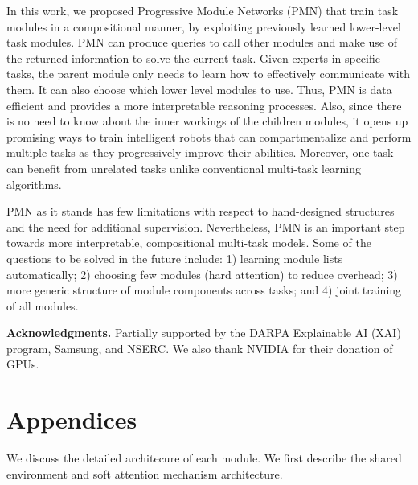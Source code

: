 \documentclass{article}
\begin{document}
In this work, we proposed Progressive Module Networks (PMN) that train task modules in a compositional manner, by exploiting previously learned lower-level task modules.
PMN can produce queries to call other modules and make use of the returned information to solve the current task.
Given experts in specific tasks, the parent module only needs to learn how to effectively communicate with them.
It can also choose which lower level modules to use.
Thus, PMN is data efficient and provides a more interpretable reasoning processes.
Also, since there is no need to know about the inner workings of the children modules,
it opens up promising ways to train intelligent robots that can compartmentalize and perform multiple tasks as they progressively improve their abilities.
Moreover, one task can benefit from unrelated tasks unlike conventional multi-task learning algorithms.

PMN as it stands has few limitations with respect to hand-designed structures and the need for additional supervision.
Nevertheless, PMN is an important step towards more interpretable, compositional multi-task models.
Some of the questions to be solved in the future include:
1) learning module lists automatically;
2) choosing few modules (hard attention) to reduce overhead;
3) more generic structure of module components across tasks; and
4) joint training of all modules.


\textbf{Acknowledgments.}
Partially supported by the DARPA Explainable AI (XAI) program, Samsung, and NSERC.
We also thank NVIDIA for their donation of GPUs.


%
%



\newpage
\appendix
\section*{Appendices}
\renewcommand{\thesection}{\Alph{section}}
We discuss the detailed architecure of each module. We first describe the shared environment and soft attention mechanism architecture.
\end{document}
